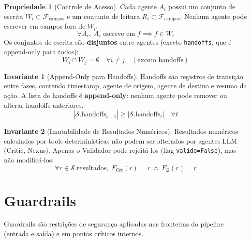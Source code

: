 \documentclass[a4paper, 12pt]{report}
\theoremstyle{definition}
\newtheorem{invariante}{Invariante}[chapter]
\newtheorem{propriedade}{Propriedade}[chapter]
\theoremstyle{remark}
\newcommand{\state}{\mathcal{S}}
\newcommand{\fila}{\mathcal{Q}}
\begin{document}
\begin{propriedade}[Controle de Acesso]
  Cada agente $A_i$ possui um conjunto de escrita
  $W_i \subset \mathcal{F}_{\text{campos}}$ e um conjunto de leitura
  $R_i \subset \mathcal{F}_{\text{campos}}$. Nenhum agente pode
  escrever em campos fora de $W_i$:
  \[
    \forall A_i,\; A_i \text{ escreve em } f \implies f \in W_i
  \]
  Os conjuntos de escrita s\~ao \textbf{disjuntos} entre agentes
  (exceto \texttt{handoffs}, que \'e append-only para todos):
  \[
    W_i \cap W_j = \emptyset \quad \forall i \neq j \quad
    (\text{exceto handoffs})
  \]
\end{propriedade}

\begin{invariante}[Append-Only para Handoffs]
  Handoffs s\~ao registros de transi\c{c}\~ao entre fases, contendo timestamp,
  agente de origem, agente de destino e resumo da a\c{c}\~ao.
  A lista de handoffs \'e \textbf{append-only}: nenhum agente
  pode remover ou alterar handoffs anteriores.
  \[
    |\state.\text{handoffs}_{t+1}| \geq |\state.\text{handoffs}_t|
    \quad \forall t
  \]
\end{invariante}

\begin{invariante}[Imutabilidade de Resultados Num\'ericos]
  Resultados num\'ericos calculados por tools determin\'isticas
  n\~ao podem ser alterados por agentes LLM (Critic, Nexus).
  Apenas o Validador pode rejeit\'a-los (flag \texttt{valido=False}),
  mas n\~ao modific\'a-los:
  \[
    \forall r \in \state.\text{resultados},\;
    F_{\text{Crt}}(r) = r \;\land\; F_{\fila}(r) = r
  \]
\end{invariante}


\section{Guardrails}

Guardrails s\~ao restri\c{c}\~oes de seguran\c{c}a aplicadas nas fronteiras
do pipeline (entrada e sa\'ida) e em pontos cr\'iticos internos.
\end{document}

